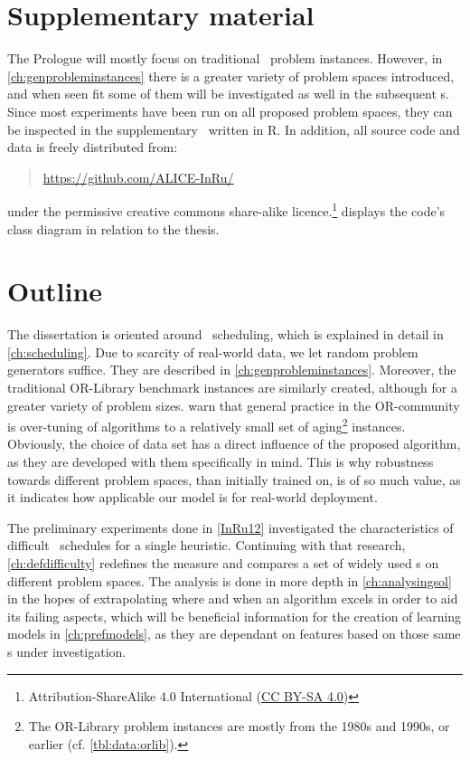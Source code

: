 \section{Supplementary material}
The Prologue will mostly focus on traditional \jsp\ problem instances. 
However, in \cref{ch:genprobleminstances} there is a greater variety of problem 
spaces introduced, and when seen fit some of them will be investigated as well 
in the subsequent s. 
Since most experiments have been run on all proposed problem spaces, they can be 
inspected in the supplementary \shiny\ written in R. 
In addition, all source code and data is freely distributed from:
\begin{quote}
    \url{https://github.com/ALICE-InRu/}
\end{quote}
under the permissive creative commons share-alike 
licence.\footnote{Attribution-ShareAlike 4.0 International 
    (\href{http://creativecommons.org/licenses/by-sa/4.0/}{CC BY-SA 4.0})}
 displays the code's class diagram in relation to the 
thesis.



\section{Outline}
The dissertation is oriented around \jsp\ scheduling, which is explained in 
detail in \cref{ch:scheduling}.
Due to scarcity of real-world data, we let random problem generators 
suffice. They are described in \cref{ch:genprobleminstances}. Moreover, the 
traditional 
OR-Library benchmark instances are similarly created, although for a greater 
variety of problem sizes. 
\citet{SmithMiles2015} warn that general practice in the OR-community is over-tuning of algorithms to a relatively small set of aging\footnote{
	The OR-Library problem instances are mostly from the 1980s and 
	1990s, or earlier (cf. \cref{tbl:data:orlib}).}
instances. 
Obviously, the choice of data set has a direct influence of the proposed 
algorithm, as they are developed with them specifically in mind. 
This is why robustness towards different problem spaces, than initially trained 
on, is of so much value, as it indicates how applicable our model is for 
real-world deployment.

The preliminary experiments done in \cref{InRu12} investigated the 
characteristics of difficult \jsp\ schedules for a single heuristic. Continuing 
with that research, \cref{ch:defdifficulty} redefines the measure and compares a set of widely used \sdr s on different problem spaces.
The analysis is done in more depth in \cref{ch:analysingsol} in the hopes of extrapolating where and when an algorithm excels in order to aid its failing aspects, which will be beneficial information for the creation of learning models in \cref{ch:prefmodels}, as they are dependant  on features based on those same \dr s under investigation.


